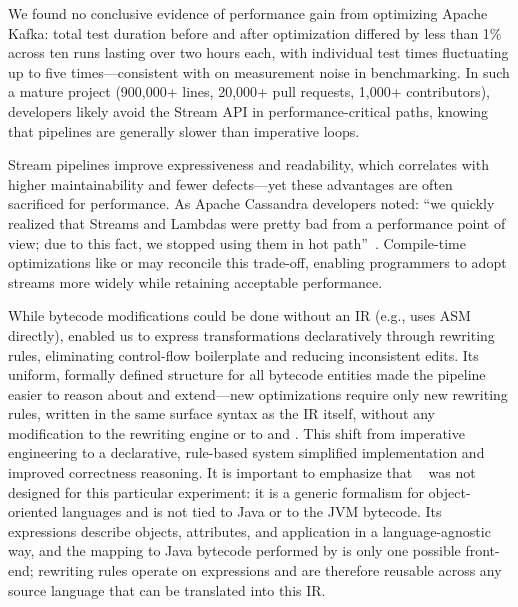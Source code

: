
We found no conclusive evidence of performance gain from optimizing Apache Kafka: total test duration before and after optimization differed by less than 1\% across ten runs lasting over two hours each, with individual test times fluctuating up to five times---consistent with \citet{georges2007statistically} on measurement noise in benchmarking.
In such a mature project (900,000+ lines, 20,000+ pull requests, 1,000+ contributors), developers likely avoid the Stream API in performance-criti\-cal paths, knowing that pipelines are generally slower than imperative loops.

Stream pipelines improve expressiveness and readability, which correlates with higher maintainability and fewer defects---yet these advantages are often sacrificed for performance.
As Apache Cassandra developers noted: ``we quickly realized that Streams and Lambdas were pretty bad from a performance point of view; due to this fact, we stopped using them in hot path''~\cite{mazinanian2017understanding}.
Compile-time optimizations like \hone{} or \streamliner{} may reconcile this trade-off, enabling programmers to adopt streams more widely while retaining acceptable performance.

While bytecode modifications could be done without an IR (e.g., \streamliner{} uses ASM directly), \phic{} enabled us to express transformations declaratively through rewriting rules, eliminating control-flow boilerplate and reducing inconsistent edits.
Its uniform, formally defined structure for all bytecode entities made the pipeline easier to reason about and extend---new optimizations require only new rewriting rules, written in the same surface syntax as the IR itself, without any modification to the rewriting engine or to \jeo{} and \phino{}.
This shift from imperative engineering to a declarative, rule-based system simplified implementation and improved correctness reasoning.
It is important to emphasize that \phic{}~\citep{bugayenko2021eolang} was not designed for this particular experiment: it is a generic formalism for object-oriented languages and is not tied to Java or to the JVM bytecode.
Its expressions describe objects, attributes, and application in a language-agnostic way, and the mapping to Java bytecode performed by \jeo{} is only one possible front-end; rewriting rules operate on \phic{} expressions and are therefore reusable across any source language that can be translated into this IR.

